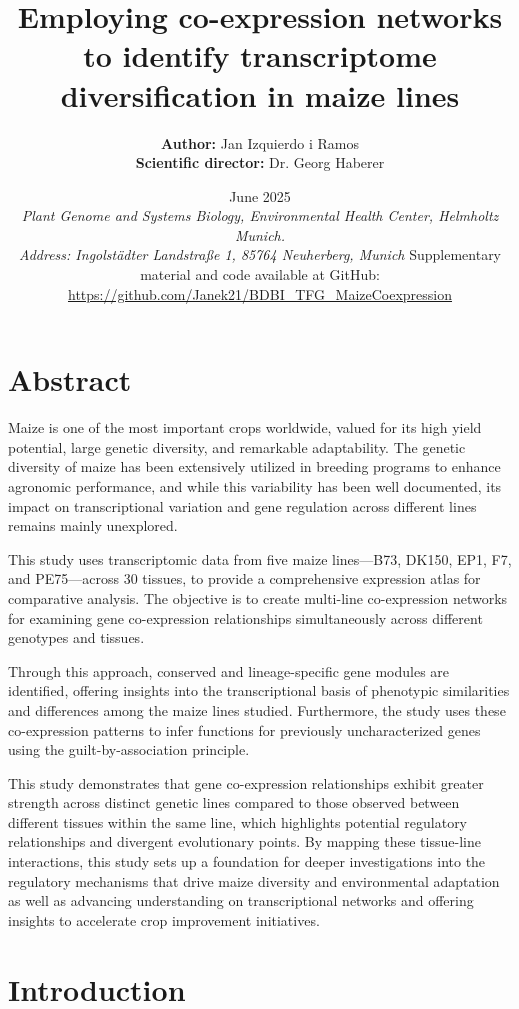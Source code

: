 \documentclass[
]{article}
\title{\protect\hypertarget{_heading=h.monioe1wkcaf}{}{}\textbf{Employing co-expression
networks to identify transcriptome diversification in maize lines}}
\author{\textbf{Author:} Jan Izquierdo i Ramos\\
	\textbf{Scientific director:} Dr. Georg Haberer}%
\date{June 2025\\ %
\small \textit{Plant Genome and Systems Biology, Environmental Health Center, Helmholtz Munich.\\ %
Address: Ingolstädter Landstraße 1, 85764 Neuherberg, Munich}
\footnotesize{Supplementary material and code available at GitHub: \href{https://github.com/Janek21/BDBI_TFG_MaizeCoexpression}{{https://github.com/Janek21/BDBI\_TFG\_MaizeCoexpression}}
}
}
\begin{document}
\maketitle

\hypertarget{abstract}{%
\section{Abstract}\label{abstract}}

Maize is one of the most important crops worldwide, valued for its high
yield potential, large genetic diversity, and remarkable adaptability.
The genetic diversity of maize has been extensively utilized in breeding
programs to enhance agronomic performance, and while this variability
has been well documented, its impact on transcriptional variation and
gene regulation across different lines remains mainly unexplored.

This study uses transcriptomic data from five maize lines---B73, DK150,
EP1, F7, and PE75---across 30 tissues, to provide a comprehensive
expression atlas for comparative analysis. The objective is to create
multi-line co-expression networks for examining gene co-expression
relationships simultaneously across different genotypes and tissues.

Through this approach, conserved and lineage-specific gene modules are
identified, offering insights into the transcriptional basis of
phenotypic similarities and differences among the maize lines studied.
Furthermore, the study uses these co-expression patterns to infer
functions for previously uncharacterized genes using the
guilt-by-association principle.

This study demonstrates that gene co-expression relationships exhibit
greater strength across distinct genetic lines compared to those
observed between different tissues within the same line, which
highlights potential regulatory relationships and divergent evolutionary
points. By mapping these tissue-line interactions, this study sets up a
foundation for deeper investigations into the regulatory mechanisms that
drive maize diversity and environmental adaptation as well as advancing
understanding on transcriptional networks and offering insights to
accelerate crop improvement initiatives.

\hypertarget{introduction}{%
\section{Introduction}\label{introduction}}
\end{document}
